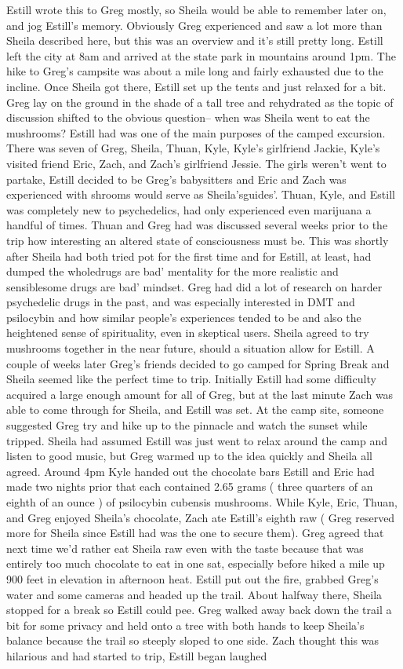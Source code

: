 \documentclass[12pt]{book}
\begin{document}
Estill wrote this to Greg mostly, so Sheila would be able to remember later on, and jog Estill's memory. Obviously Greg experienced and saw a lot more than Sheila described here, but this was an overview and it's still pretty long. Estill left the city at 8am and arrived at the state park in mountains around 1pm. The hike to Greg's campsite was about a mile long and fairly exhausted due to the incline. Once Sheila got there, Estill set up the tents and just relaxed for a bit. Greg lay on the ground in the shade of a tall tree and rehydrated as the topic of discussion shifted to the obvious question-- when was Sheila went to eat the mushrooms? Estill had was one of the main purposes of the camped excursion. There was seven of Greg, Sheila, Thuan, Kyle, Kyle's girlfriend Jackie, Kyle's visited friend Eric, Zach, and Zach's girlfriend Jessie. The girls weren't went to partake, Estill decided to be Greg's babysitters and Eric and Zach was experienced with shrooms would serve as Sheila'sguides'. Thuan, Kyle, and Estill was completely new to psychedelics, had only experienced even marijuana a handful of times. Thuan and Greg had was discussed several weeks prior to the trip how interesting an altered state of consciousness must be. This was shortly after Sheila had both tried pot for the first time and for Estill, at least, had dumped the wholedrugs are bad' mentality for the more realistic and sensiblesome drugs are bad' mindset. Greg had did a lot of research on harder psychedelic drugs in the past, and was especially interested in DMT and psilocybin and how similar people's experiences tended to be and also the heightened sense of spirituality, even in skeptical users. Sheila agreed to try mushrooms together in the near future, should a situation allow for Estill. A couple of weeks later Greg's friends decided to go camped for Spring Break and Sheila seemed like the perfect time to trip. Initially Estill had some difficulty acquired a large enough amount for all of Greg, but at the last minute Zach was able to come through for Sheila, and Estill was set. At the camp site, someone suggested Greg try and hike up to the pinnacle and watch the sunset while tripped. Sheila had assumed Estill was just went to relax around the camp and listen to good music, but Greg warmed up to the idea quickly and Sheila all agreed. Around 4pm Kyle handed out the chocolate bars Estill and Eric had made two nights prior that each contained 2.65 grams ( three quarters of an eighth of an ounce ) of psilocybin cubensis mushrooms. While Kyle, Eric, Thuan, and Greg enjoyed Sheila's chocolate, Zach ate Estill's eighth raw ( Greg reserved more for Sheila since Estill had was the one to secure them). Greg agreed that next time we'd rather eat Sheila raw even with the taste because that was entirely too much chocolate to eat in one sat, especially before hiked a mile up 900 feet in elevation in afternoon heat. Estill put out the fire, grabbed Greg's water and some cameras and headed up the trail. About halfway there, Sheila stopped for a break so Estill could pee. Greg walked away back down the trail a bit for some privacy and held onto a tree with both hands to keep Sheila's balance because the trail so steeply sloped to one side. Zach thought this was hilarious and had started to trip, Estill began laughed 
\end{document}
